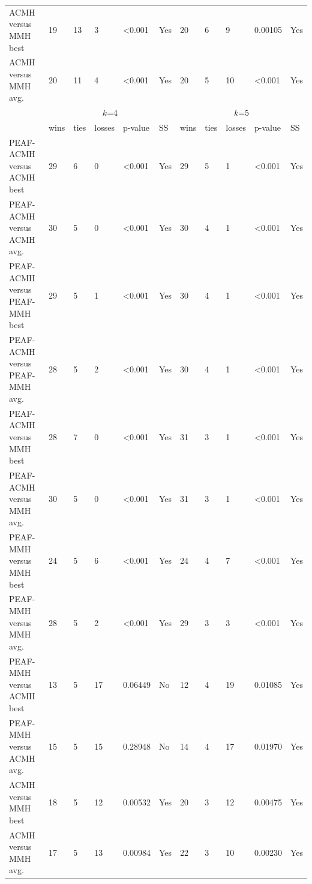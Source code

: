 \documentclass[12pt, a4paper]{article}%
\numberwithin{equation}{section}
\theoremstyle{plain}
\begin{document}
{\begin{landscape}
\begin{longtable}{|l|lllll|lllll|}
						ACMH versus MMH best                   & 19   & 13   & 3      & \textless{}0.001 & Yes & 20   & 6    & 9      & 0.00105          & Yes \\
						ACMH versus MMH avg.                   & 20   & 11   & 4      & \textless{}0.001 & Yes & 20   & 5    & 10     & \textless{}0.001 & Yes \\ \hline
						\multicolumn{1}{|c|}{\multirow{2}{*}{}} & \multicolumn{5}{c|}{$k$=4}                    & \multicolumn{5}{c|}{$k$=5}                    \\ \cline{2-11} 
						\multicolumn{1}{|c|}{}                  & wins & ties & losses & p-value          & SS  & wins & ties & losses & p-value          & SS  \\ \hline
						PEAF-ACMH versus ACMH best             & 29   & 6    & 0      & \textless{}0.001 & Yes & 29   & 5    & 1      & \textless{}0.001 & Yes \\
						PEAF-ACMH versus ACMH avg.             & 30   & 5    & 0      & \textless{}0.001 & Yes & 30   & 4    & 1      & \textless{}0.001 & Yes \\
						PEAF-ACMH versus PEAF-MMH best           & 29   & 5    & 1      & \textless{}0.001 & Yes & 30   & 4    & 1      & \textless{}0.001 & Yes \\
						PEAF-ACMH versus PEAF-MMH avg.           & 28   & 5    & 2      & \textless{}0.001 & Yes & 30   & 4    & 1      & \textless{}0.001 & Yes \\
						PEAF-ACMH versus MMH best               & 28   & 7    & 0      & \textless{}0.001 & Yes & 31   & 3    & 1      & \textless{}0.001 & Yes \\
						PEAF-ACMH versus MMH avg.               & 30   & 5    & 0      & \textless{}0.001 & Yes & 31   & 3    & 1      & \textless{}0.001 & Yes \\
						PEAF-MMH versus MMH best                 & 24   & 5    & 6      & \textless{}0.001 & Yes & 24   & 4    & 7      & \textless{}0.001 & Yes \\
						PEAF-MMH versus MMH avg.                 & 28   & 5    & 2      & \textless{}0.001 & Yes & 29   & 3    & 3      & \textless{}0.001 & Yes \\
						PEAF-MMH versus ACMH best               & 13   & 5    & 17     & 0.06449          & No  & 12   & 4    & 19     & 0.01085          & Yes \\
						PEAF-MMH versus ACMH avg.               & 15   & 5    & 15     & 0.28948          & No  & 14   & 4    & 17     & 0.01970          & Yes \\
						ACMH versus MMH best                   & 18   & 5    & 12     & 0.00532          & Yes & 20   & 3    & 12     & 0.00475          & Yes \\
						ACMH versus MMH avg.                   & 17   & 5    & 13     & 0.00984          & Yes & 22   & 3    & 10     & 0.00230          & Yes \\ \hline
					\end{longtable}
				\end{landscape}
			}
			
\end{document}
